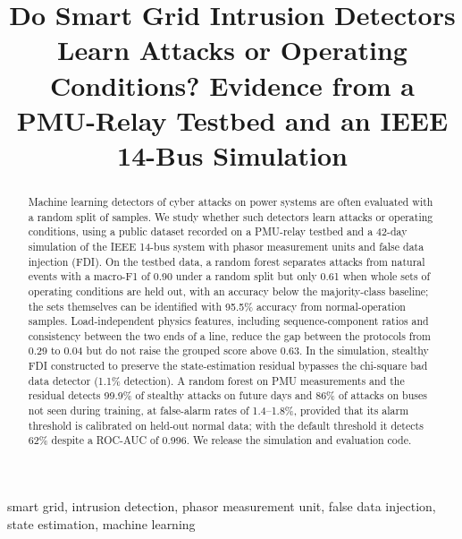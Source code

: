 \documentclass[conference]{IEEEtran}
\begin{document}
\title{Do Smart Grid Intrusion Detectors Learn Attacks or Operating Conditions? Evidence from a PMU-Relay Testbed and an IEEE 14-Bus Simulation}

\author{
}

\maketitle

\begin{abstract}
Machine learning detectors of cyber attacks on power systems are often evaluated with a random split of samples. We study whether such detectors learn attacks or operating conditions, using a public dataset recorded on a PMU-relay testbed and a 42-day simulation of the IEEE 14-bus system with phasor measurement units and false data injection (FDI). On the testbed data, a random forest separates attacks from natural events with a macro-F1 of 0.90 under a random split but only 0.61 when whole sets of operating conditions are held out, with an accuracy below the majority-class baseline; the sets themselves can be identified with 95.5\% accuracy from normal-operation samples. Load-independent physics features, including sequence-component ratios and consistency between the two ends of a line, reduce the gap between the protocols from 0.29 to 0.04 but do not raise the grouped score above 0.63. In the simulation, stealthy FDI constructed to preserve the state-estimation residual bypasses the chi-square bad data detector (1.1\% detection). A random forest on PMU measurements and the residual detects 99.9\% of stealthy attacks on future days and 86\% of attacks on buses not seen during training, at false-alarm rates of 1.4--1.8\%, provided that its alarm threshold is calibrated on held-out normal data; with the default threshold it detects 62\% despite a ROC-AUC of 0.996. We release the simulation and evaluation code.
\end{abstract}

\begin{IEEEkeywords}
smart grid, intrusion detection, phasor measurement unit, false data injection, state estimation, machine learning
\end{IEEEkeywords}
\end{document}
